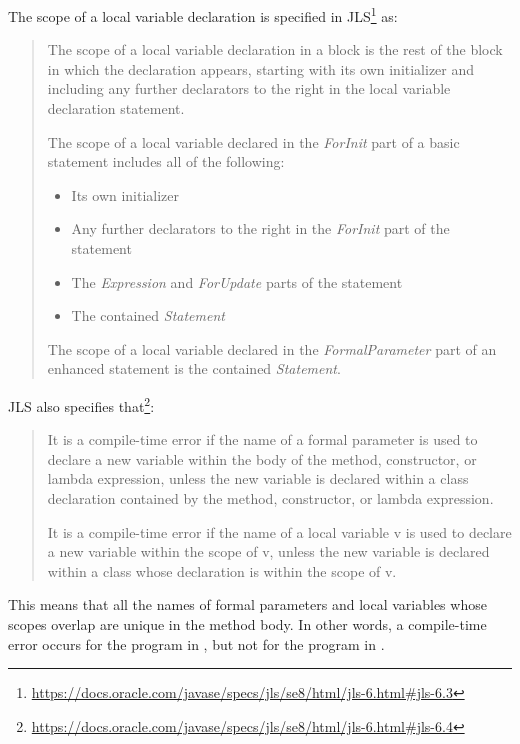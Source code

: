 The scope of a local variable declaration is specified in JLS\footnote{\url{https://docs.oracle.com/javase/specs/jls/se8/html/jls-6.html#jls-6.3}} as:
\begin{quote}
    The scope of a local variable declaration in a block is the rest of the block in which the declaration
    appears, starting with its own initializer and including any further declarators to the right in the local variable
    declaration statement.

    The scope of a local variable declared in the \textit{ForInit} part of a basic  statement includes all of
    the following:
\begin{itemize}
    \item Its own initializer
    \item Any further declarators to the right in the \textit{ForInit} part of the  statement
    \item The \textit{Expression} and \textit{ForUpdate} parts of the  statement
    \item The contained \textit{Statement}
\end{itemize}

    The scope of a local variable declared in the \textit{FormalParameter} part of an enhanced  statement
    is the contained \textit{Statement}.
\end{quote}

JLS also specifies that\footnote{\url{https://docs.oracle.com/javase/specs/jls/se8/html/jls-6.html#jls-6.4}}:
\begin{quote}
    It is a compile-time error if the name of a formal parameter is used to declare a new variable within the body of
    the method, constructor, or lambda expression, unless the new variable is declared within a class declaration
    contained by the method, constructor, or lambda expression.

    It is a compile-time error if the name of a local variable v is used to declare a new variable within the scope of
    v, unless the new variable is declared within a class whose declaration is within the scope of v.
\end{quote}

This means that all the names of formal parameters and local variables whose scopes overlap are unique in the method
body. In other words, a compile-time error occurs for the program in
, but not for the program in
.

